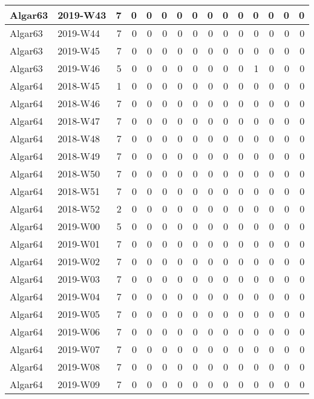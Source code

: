 \documentclass[]{book}
\begin{document}
\begin{table}
\begin{tabular}[t]{l|l|r|r|r|r|r|r|r|r|r|r|r|r|r}
\hline
Algar63 & 2019-W43 & 7 & 0 & 0 & 0 & 0 & 0 & 0 & 0 & 0 & 0 & 0 & 0 & 0\\
\hline
Algar63 & 2019-W44 & 7 & 0 & 0 & 0 & 0 & 0 & 0 & 0 & 0 & 0 & 0 & 0 & 0\\
\hline
Algar63 & 2019-W45 & 7 & 0 & 0 & 0 & 0 & 0 & 0 & 0 & 0 & 0 & 0 & 0 & 0\\
\hline
Algar63 & 2019-W46 & 5 & 0 & 0 & 0 & 0 & 0 & 0 & 0 & 0 & 1 & 0 & 0 & 0\\
\hline
Algar64 & 2018-W45 & 1 & 0 & 0 & 0 & 0 & 0 & 0 & 0 & 0 & 0 & 0 & 0 & 0\\
\hline
Algar64 & 2018-W46 & 7 & 0 & 0 & 0 & 0 & 0 & 0 & 0 & 0 & 0 & 0 & 0 & 0\\
\hline
Algar64 & 2018-W47 & 7 & 0 & 0 & 0 & 0 & 0 & 0 & 0 & 0 & 0 & 0 & 0 & 0\\
\hline
Algar64 & 2018-W48 & 7 & 0 & 0 & 0 & 0 & 0 & 0 & 0 & 0 & 0 & 0 & 0 & 0\\
\hline
Algar64 & 2018-W49 & 7 & 0 & 0 & 0 & 0 & 0 & 0 & 0 & 0 & 0 & 0 & 0 & 0\\
\hline
Algar64 & 2018-W50 & 7 & 0 & 0 & 0 & 0 & 0 & 0 & 0 & 0 & 0 & 0 & 0 & 0\\
\hline
Algar64 & 2018-W51 & 7 & 0 & 0 & 0 & 0 & 0 & 0 & 0 & 0 & 0 & 0 & 0 & 0\\
\hline
Algar64 & 2018-W52 & 2 & 0 & 0 & 0 & 0 & 0 & 0 & 0 & 0 & 0 & 0 & 0 & 0\\
\hline
Algar64 & 2019-W00 & 5 & 0 & 0 & 0 & 0 & 0 & 0 & 0 & 0 & 0 & 0 & 0 & 0\\
\hline
Algar64 & 2019-W01 & 7 & 0 & 0 & 0 & 0 & 0 & 0 & 0 & 0 & 0 & 0 & 0 & 0\\
\hline
Algar64 & 2019-W02 & 7 & 0 & 0 & 0 & 0 & 0 & 0 & 0 & 0 & 0 & 0 & 0 & 0\\
\hline
Algar64 & 2019-W03 & 7 & 0 & 0 & 0 & 0 & 0 & 0 & 0 & 0 & 0 & 0 & 0 & 0\\
\hline
Algar64 & 2019-W04 & 7 & 0 & 0 & 0 & 0 & 0 & 0 & 0 & 0 & 0 & 0 & 0 & 0\\
\hline
Algar64 & 2019-W05 & 7 & 0 & 0 & 0 & 0 & 0 & 0 & 0 & 0 & 0 & 0 & 0 & 0\\
\hline
Algar64 & 2019-W06 & 7 & 0 & 0 & 0 & 0 & 0 & 0 & 0 & 0 & 0 & 0 & 0 & 0\\
\hline
Algar64 & 2019-W07 & 7 & 0 & 0 & 0 & 0 & 0 & 0 & 0 & 0 & 0 & 0 & 0 & 0\\
\hline
Algar64 & 2019-W08 & 7 & 0 & 0 & 0 & 0 & 0 & 0 & 0 & 0 & 0 & 0 & 0 & 0\\
\hline
Algar64 & 2019-W09 & 7 & 0 & 0 & 0 & 0 & 0 & 0 & 0 & 0 & 0 & 0 & 0 & 0\\

\end{tabular}
\end{table}
\end{document}
